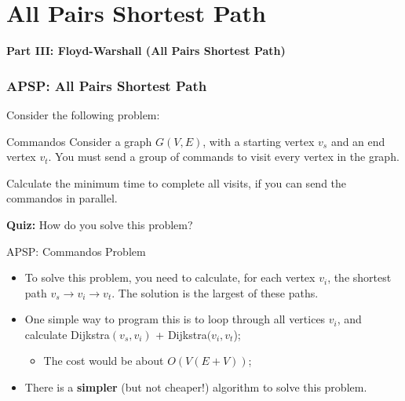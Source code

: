 \section{All Pairs Shortest Path}

\begin{frame}
  \begin{center}
    {\bf Part III: Floyd-Warshall (All Pairs Shortest Path)}
  \end{center}
\end{frame}

\begin{frame}
  \frametitle{APSP: All Pairs Shortest Path}

  Consider the following problem:

  \begin{block}{Commandos}
    Consider a graph $G(V,E)$, with a starting vertex $v_s$ and an end vertex $v_t$. You must send a group of commands to visit every vertex in the graph.\bigskip

    Calculate the minimum time to complete all visits, if you can send the commandos in parallel.
  \end{block}

  {\bf Quiz:} How do you solve this problem?
\end{frame}

\begin{frame}{APSP: Commandos Problem}
  \begin{itemize}
  \item To solve this problem, you need to calculate, for each vertex $v_i$, the shortest path $v_s \to v_i \to v_t$. The solution is the largest of these paths.\bigskip

  \item One simple way to program this is to loop through all vertices $v_i$, and calculate Dijkstra$(v_s,v_i)$ + Dijkstra$(v_i,v_t$);
  \begin{itemize}
    \item The cost would be about $O(V(E+V))$;
  \end{itemize}\bigskip

  \item There is a {\bf simpler} (but not cheaper!) algorithm to solve this problem.
  \end{itemize}
\end{frame}

